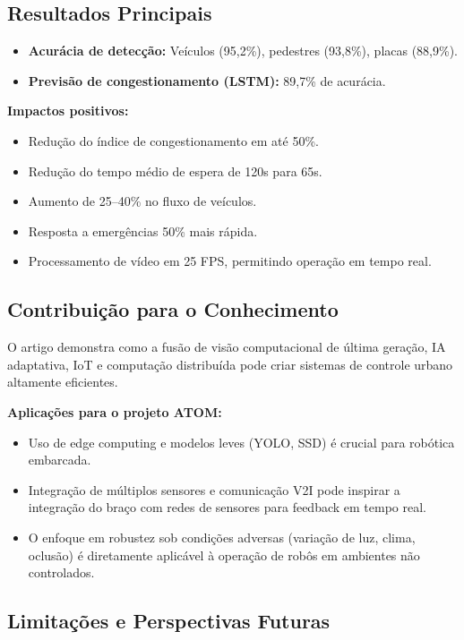 \documentclass{article}
\begin{document}
\subsection*{Resultados Principais}

\begin{itemize}
    \item \textbf{Acurácia de detecção:} Veículos (95,2\%), pedestres (93,8\%), placas (88,9\%).
    \item \textbf{Previsão de congestionamento (LSTM):} 89,7\% de acurácia.
\end{itemize}

\textbf{Impactos positivos:}
\begin{itemize}
    \item Redução do índice de congestionamento em até 50\%.
    \item Redução do tempo médio de espera de 120s para 65s.
    \item Aumento de 25--40\% no fluxo de veículos.
    \item Resposta a emergências 50\% mais rápida.
    \item Processamento de vídeo em 25 FPS, permitindo operação em tempo real.
\end{itemize}

\subsection*{Contribuição para o Conhecimento}

O artigo demonstra como a fusão de visão computacional de última geração, IA adaptativa, IoT e computação distribuída pode criar sistemas de controle urbano altamente eficientes.

\textbf{Aplicações para o projeto ATOM:}
\begin{itemize}
    \item Uso de edge computing e modelos leves (YOLO, SSD) é crucial para robótica embarcada.
    \item Integração de múltiplos sensores e comunicação V2I pode inspirar a integração do braço com redes de sensores para feedback em tempo real.
    \item O enfoque em robustez sob condições adversas (variação de luz, clima, oclusão) é diretamente aplicável à operação de robôs em ambientes não controlados.
\end{itemize}

\subsection*{Limitações e Perspectivas Futuras}
\end{document}
